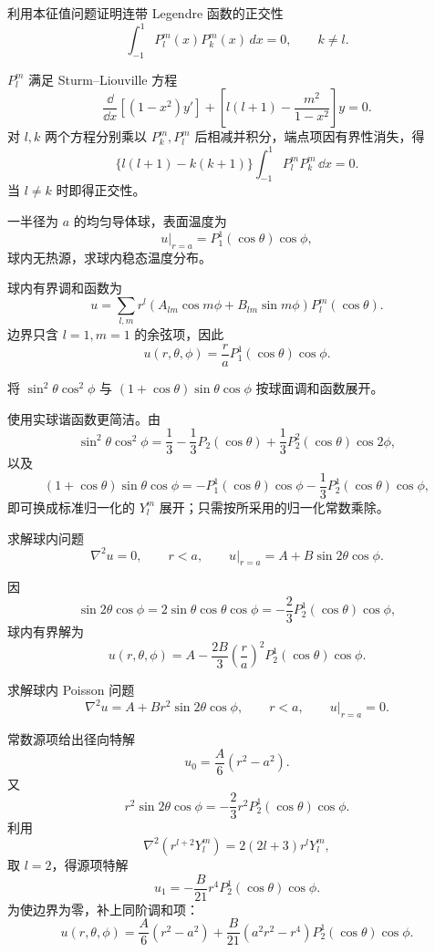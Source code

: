 ﻿


\begin{question}
利用本征值问题证明连带 Legendre 函数的正交性
\[
\int_{-1}^1P_l^m(x)P_k^m(x)\,dx=0,\qquad k\ne l.
\]
\begin{solution}
\(P_l^m\) 满足 Sturm--Liouville 方程
\[
\frac{\dd}{\dd{x}}\left[(1-x^2)y'\right]
+\left[l(l+1)-\frac{m^2}{1-x^2}\right]y=0.
\]
对 \(l,k\) 两个方程分别乘以 \(P_k^m,P_l^m\) 后相减并积分，端点项因有界性消失，得
\[
\{l(l+1)-k(k+1)\}\int_{-1}^{1}P_l^mP_k^m\,\dd{x}=0.
\]
当 \(l\ne k\) 时即得正交性。
\end{solution}
\end{question}

\begin{question}
一半径为 \(a\) 的均匀导体球，表面温度为
\[
u|_{r=a}=P_1^1(\cos\theta)\cos\phi,
\]
球内无热源，求球内稳态温度分布。
\begin{solution}
球内有界调和函数为
\[
u=\sum_{l,m}r^l\left(A_{lm}\cos m\phi+B_{lm}\sin m\phi\right)P_l^m(\cos\theta).
\]
边界只含 \(l=1,m=1\) 的余弦项，因此
\[
u(r,\theta,\phi)=\frac ra P_1^1(\cos\theta)\cos\phi.
\]
\end{solution}
\end{question}

\begin{question}
将 \(\sin^2\theta\cos^2\phi\) 与 \((1+\cos\theta)\sin\theta\cos\phi\) 按球面调和函数展开。
\begin{solution}
使用实球谐函数更简洁。由
\[
\sin^2\theta\cos^2\phi=\frac13-\frac13P_2(\cos\theta)
+\frac13P_2^2(\cos\theta)\cos2\phi,
\]
以及
\[
(1+\cos\theta)\sin\theta\cos\phi
=-P_1^1(\cos\theta)\cos\phi-\frac13P_2^1(\cos\theta)\cos\phi,
\]
即可换成标准归一化的 \(Y_l^m\) 展开；只需按所采用的归一化常数乘除。
\end{solution}
\end{question}

\begin{question}
求解球内问题
\[
\nabla^2u=0,\qquad r<a,\qquad
u|_{r=a}=A+B\sin2\theta\cos\phi.
\]
\begin{solution}
因
\[
\sin2\theta\cos\phi=2\sin\theta\cos\theta\cos\phi
=-\frac23P_2^1(\cos\theta)\cos\phi,
\]
球内有界解为
\[
u(r,\theta,\phi)=A-\frac{2B}{3}\left(\frac ra\right)^2
P_2^1(\cos\theta)\cos\phi.
\]
\end{solution}
\end{question}

\begin{question}
求解球内 Poisson 问题
\[
\nabla^2u=A+Br^2\sin2\theta\cos\phi,\qquad r<a,\qquad u|_{r=a}=0.
\]
\begin{solution}
常数源项给出径向特解
\[
u_0=\frac A6(r^2-a^2).
\]
又
\[
r^2\sin2\theta\cos\phi=-\frac23r^2P_2^1(\cos\theta)\cos\phi.
\]
利用
\[
\nabla^2\left(r^{l+2}Y_l^m\right)=2(2l+3)r^lY_l^m,
\]
取 \(l=2\)，得源项特解
\[
u_1=-\frac{B}{21}r^4P_2^1(\cos\theta)\cos\phi.
\]
为使边界为零，补上同阶调和项：
\[
u(r,\theta,\phi)=\frac A6(r^2-a^2)
+\frac{B}{21}(a^2r^2-r^4)P_2^1(\cos\theta)\cos\phi.
\]
\end{solution}
\end{question}

